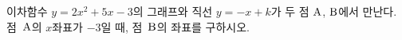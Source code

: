 이차함수 $y=2x^2+5x-3$의 그래프와 직선 $y=-x+k$가 두 점 $\mathrm{A}$, $\mathrm{B}$에서 만난다. 점~$\mathrm{A}$의 $x$좌표가 $-3$일 때, 점~$\mathrm{B}$의 좌표를 구하시오. 
